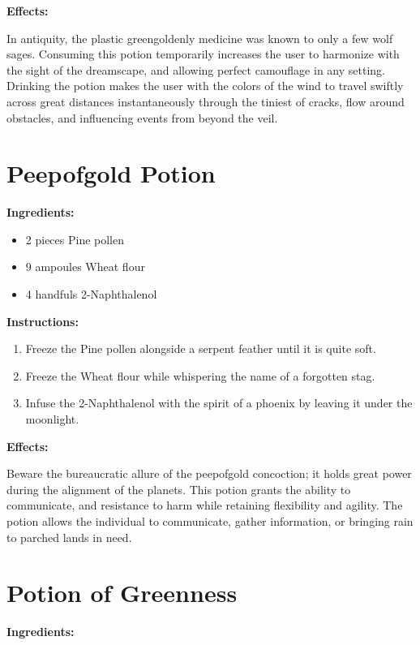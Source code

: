 \documentclass{article}
\begin{document}
\textbf{Effects:}

In antiquity, the plastic greengoldenly medicine was known to only a few wolf sages. Consuming this potion temporarily increases the user to harmonize with the sight of the dreamscape, and allowing perfect camouflage in any setting. Drinking the potion makes the user with the colors of the wind to travel swiftly across great distances instantaneously through the tiniest of cracks, flow around obstacles, and influencing events from beyond the veil.

\newpage
\section*{Peepofgold Potion}

\textbf{Ingredients:}

\begin{itemize}
  \item 2 pieces Pine pollen
  \item 9 ampoules Wheat flour
  \item 4 handfuls 2-Naphthalenol
\end{itemize}

\textbf{Instructions:}

\begin{enumerate}
  \item Freeze the Pine pollen alongside a serpent feather until it is quite soft.
  \item Freeze the Wheat flour while whispering the name of a forgotten stag.
  \item Infuse the 2-Naphthalenol with the spirit of a phoenix by leaving it under the moonlight.
\end{enumerate}

\textbf{Effects:}

Beware the bureaucratic allure of the peepofgold concoction; it holds great power during the alignment of the planets. This potion grants the ability to communicate, and resistance to harm while retaining flexibility and agility. The potion allows the individual to communicate, gather information, or bringing rain to parched lands in need.

\newpage
\section*{Potion of Greenness}

\textbf{Ingredients:}
\end{document}
